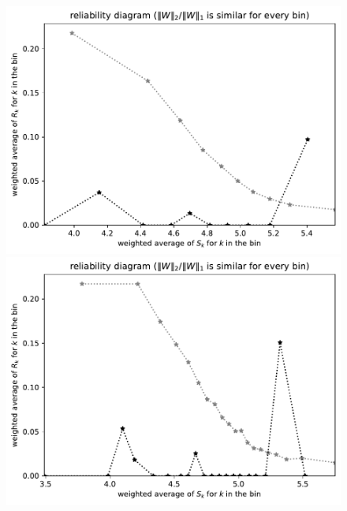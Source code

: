 \documentclass{article}
\begin{document}
\begin{figure}
\begin{centering}
\parbox{\imsize}{\includegraphics[width=\imsize]
{./codes/weighted/County_of_Humboldt-LNGI/equierrs10}}
\quad\quad
\parbox{\imsize}{\includegraphics[width=\imsize]
{./codes/weighted/County_of_Humboldt-LNGI/equierrs20}}


\end{centering}
\end{figure}
\end{document}
